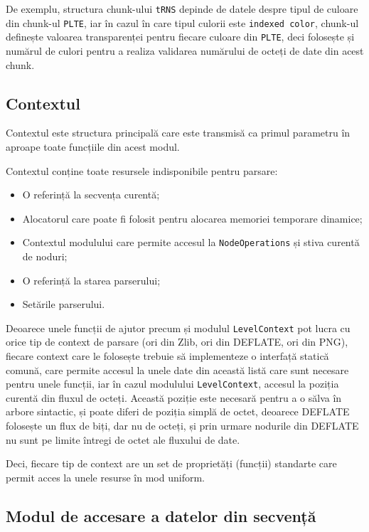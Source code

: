 \documentclass[a4paper,12pt]{report}
\begin{document}
De exemplu, structura chunk-ului \texttt{tRNS} depinde de datele despre
tipul de culoare din chunk-ul \texttt{PLTE}, iar în cazul în care tipul culorii este \texttt{indexed color},
chunk-ul definește valoarea transparenței pentru fiecare culoare din \texttt{PLTE},
deci folosește și numărul de culori pentru a realiza validarea numărului de octeți de date din acest chunk.

\subsection{Contextul}

Contextul este structura principală care este transmisă ca primul parametru
în aproape toate funcțiile din acest modul.

Contextul conține toate resursele indisponibile pentru parsare:
\begin{itemize}
    \item O referință la secvența curentă;
    \item Alocatorul care poate fi folosit pentru alocarea memoriei temporare dinamice;
    \item Contextul modulului care permite accesul la \texttt{NodeOperations} și stiva curentă de noduri;
    \item O referință la starea parserului;
    \item Setările parserului.
\end{itemize}

Deoarece unele funcții de ajutor precum și modulul \texttt{LevelContext}
pot lucra cu orice tip de context de parsare (ori din Zlib, ori din DEFLATE, ori din \ac{PNG}),
fiecare context care le folosește trebuie să implementeze o interfață statică comună,
care permite accesul la unele date din această listă care sunt necesare pentru unele funcții,
iar în cazul modulului \texttt{LevelContext},
accesul la poziția curentă din fluxul de octeți.
Această poziție este necesară pentru a o sălva în arbore sintactic,
și poate diferi de poziția simplă de octet,
deoarece DEFLATE folosește un flux de biți, dar nu de octeți,
și prin urmare nodurile din DEFLATE nu sunt pe limite întregi de octet ale fluxului de date.

Deci, fiecare tip de context are un set de proprietăți (funcții) standarte
care permit acces la unele resurse în mod uniform.


\subsection{Modul de accesare a datelor din secvență}
\end{document}
